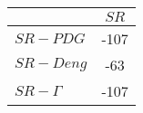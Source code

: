 \begin{tabular}{l|c}
\toprule
{} &  $SR$ \\
\midrule
\textbf{$SR-PDG$   } &  -107 \\
\textbf{$SR-Deng$  } &   -63 \\
\textbf{$SR-\Gamma$} &  -107 \\
\bottomrule
\end{tabular}
